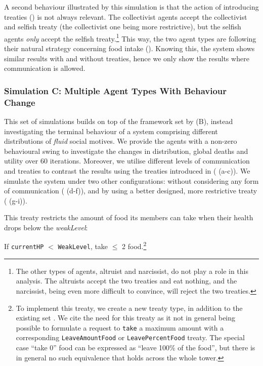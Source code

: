 A second behaviour illustrated by this simulation is that the action of introducing treaties () is not always relevant. The collectivist agents accept the collectivist and selfish treaty (the collectivist one being more restrictive), but the selfish agents \textit{only} accept the selfish treaty.\footnote{The other types of agents, altruist and narcissist, do not play a role in this analysis. The altruists accept the two treaties and eat nothing, and the narcissist, being even more difficult to convince, will reject the two treaties.} This way, the two agent types are following their natural strategy concerning food intake (). Knowing this, the system shows similar results with and without treaties, hence we only show the results where communication is allowed.

\subsubsection{Simulation C: Multiple Agent Types With Behaviour Change}\label{simulation_C}

This set of simulations builds on top of the framework set by (B), instead investigating the terminal behaviour of a system comprising different distributions of \textit{fluid} social motives. We provide the agents with a non-zero behavioural swing to investigate the changes in distribution, global deaths and utility over 60 iterations. Moreover, we utilise different levels of communication and treaties to contrast the results using the treaties introduced in  ( (a-c)). We simulate the system under two other configurations: without considering any form of communication ( (d-f)), and by using a better designed, more restrictive treaty ( (g-i)).

This treaty restricts the amount of food its members can take when their health drops below the \textit{weakLevel}:

If \texttt{currentHP} $<$ \texttt{WeakLevel}, take $\leq$ 2 food.\footnote{To implement this treaty, we create a new treaty type, in addition to the existing set . We cite the need for this treaty as it not in general being possible to formulate a request to \texttt{take} a maximum amount with a corresponding \texttt{LeaveAmountFood} or \texttt{LeavePercentFood} treaty. The special case ``take 0'' food can be expressed as ``leave 100\% of the food'', but there is in general no such equivalence that holds across the whole tower.}


